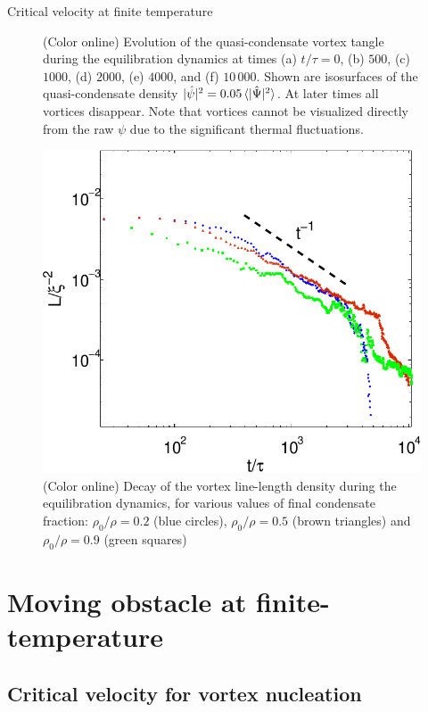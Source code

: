 \begin{chapter}{\label{cha:nonequib}Critical velocity at finite temperature}
\begin{figure}
    \caption{(Color online) Evolution of the quasi-condensate vortex tangle during the equilibration dynamics at times (a) $t/\tau=0$, (b) $500$, (c) $1000$, (d) $2000$, (e) $4000$, and (f) $10\,000$.  Shown are isosurfaces of the quasi-condensate density $|\hat{\psi}|^2 = 0.05\braket{|\hat{\Psi}|^2}$. At later times all vortices disappear.  Note that vortices cannot be visualized directly from the raw $\psi$ due to the significant thermal fluctuations.
}
    \label{fig:thermal}
\end{figure}


\begin{figure}
  \centering
    \includegraphics[width=0.45\linewidth]{nonequib/figures/ll_t_2}
    \caption{(Color online) 
Decay of the vortex line-length density during the equilibration dynamics, for various values of final condensate fraction:  $\rho_0/\rho = 0.2$ (blue circles), $\rho_0/\rho = 0.5$ (brown triangles) and $\rho_0/\rho = 0.9$ (green squares)
}
    \label{fig:ll_t}
\end{figure}




\section{Moving obstacle at finite-temperature\label{sec:obstacle}}

\subsection{Critical velocity for vortex nucleation}


\end{chapter}
